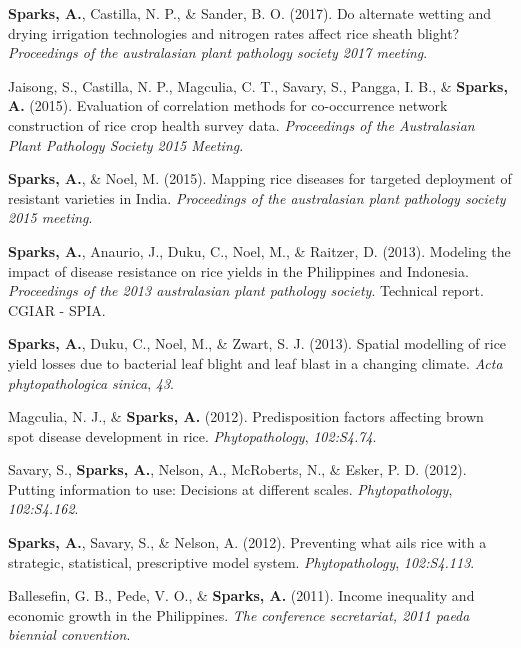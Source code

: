 \documentclass[11pt, a4paper]{awesome-cv}
\begin{document}
\leavevmode\hypertarget{ref-Sparks2017b}{}%
\textbf{Sparks, A.}, Castilla, N. P., \& Sander, B. O. (2017). Do alternate wetting and drying irrigation technologies and nitrogen rates affect rice sheath blight? \emph{Proceedings of the australasian plant pathology society 2017 meeting}.

\leavevmode\hypertarget{ref-Jaisong2015}{}%
Jaisong, S., Castilla, N. P., Magculia, C. T., Savary, S., Pangga, I. B., \& \textbf{Sparks, A.} (2015). Evaluation of correlation methods for co-occurrence network construction of rice crop health survey data. \emph{Proceedings of the Australasian Plant Pathology Society 2015 Meeting}.

\leavevmode\hypertarget{ref-Sparks2015}{}%
\textbf{Sparks, A.}, \& Noel, M. (2015). Mapping rice diseases for targeted deployment of resistant varieties in India. \emph{Proceedings of the australasian plant pathology society 2015 meeting}.

\leavevmode\hypertarget{ref-Sparks2013}{}%
\textbf{Sparks, A.}, Anaurio, J., Duku, C., Noel, M., \& Raitzer, D. (2013). Modeling the impact of disease resistance on rice yields in the Philippines and Indonesia. \emph{Proceedings of the 2013 australasian plant pathology society}. Technical report. CGIAR - SPIA.

\leavevmode\hypertarget{ref-Sparks2013a}{}%
\textbf{Sparks, A.}, Duku, C., Noel, M., \& Zwart, S. J. (2013). Spatial modelling of rice yield losses due to bacterial leaf blight and leaf blast in a changing climate. \emph{Acta phytopathologica sinica}, \emph{43}.

\leavevmode\hypertarget{ref-Magculia2012}{}%
Magculia, N. J., \& \textbf{Sparks, A.} (2012). Predisposition factors affecting brown spot disease development in rice. \emph{Phytopathology}, \emph{102:S4.74}.

\leavevmode\hypertarget{ref-Savary2012}{}%
Savary, S., \textbf{Sparks, A.}, Nelson, A., McRoberts, N., \& Esker, P. D. (2012). Putting information to use: Decisions at different scales. \emph{Phytopathology}, \emph{102:S4.162}.

\leavevmode\hypertarget{ref-Sparks2012}{}%
\textbf{Sparks, A.}, Savary, S., \& Nelson, A. (2012). Preventing what ails rice with a strategic, statistical, prescriptive model system. \emph{Phytopathology}, \emph{102:S4.113}.

\leavevmode\hypertarget{ref-Ballesefin2011}{}%
Ballesefin, G. B., Pede, V. O., \& \textbf{Sparks, A.} (2011). Income inequality and economic growth in the Philippines. \emph{The conference secretariat, 2011 paeda biennial convention}.
\end{document}

